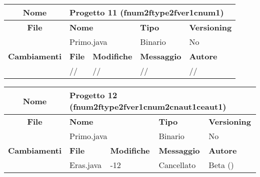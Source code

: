 
\begin{table}[ht]
\footnotesize
\begin{tabular}{|c|p{2.5cm}|p{2cm}|p{2.5cm}|p{2.5cm}|}
  \hline
  \textbf{Nome}	& \multicolumn{4}{l|}{Progetto 11 (fnum2ftype2fver1cnum1)} 										\\
  \hline
  \rowcolor{lightgray}\textbf{File} 		& \multicolumn{2}{l|}{\textbf{Nome}}		& \textbf{Tipo}		& \textbf{Versioning} 		\\
						\cline{2-5}
						& \multicolumn{2}{l|}{Primo.java}		& Binario		& No				\\
  \hline
  \rowcolor{lightgray}\textbf{Cambiamenti}	& \textbf{File}		&\textbf{Modifiche}	& \textbf{Messaggio}	& \textbf{Autore}		\\
						\cline{2-5}
						& //			& //	  		& //			& //				\\
						
  \hline
\end{tabular}
\end{table}

\begin{table}[ht]
\footnotesize
\begin{tabular}{|c|p{2.5cm}|p{2cm}|p{2.5cm}|p{2.5cm}|}
  \hline
  \textbf{Nome}	& \multicolumn{4}{l|}{Progetto 12 (fnum2ftype2fver1cnum2cnaut1ceaut1)} 									\\
  \hline
  \rowcolor{lightgray}\textbf{File} 		& \multicolumn{2}{l|}{\textbf{Nome}}		& \textbf{Tipo}		& \textbf{Versioning} 		\\
						\cline{2-5}
						& \multicolumn{2}{l|}{Primo.java}		& Binario		& No				\\
  \hline
  \rowcolor{lightgray}\textbf{Cambiamenti}	& \textbf{File}		&\textbf{Modifiche}	& \textbf{Messaggio}	& \textbf{Autore}		\\
						\cline{2-5}
						& Eras.java		& -12	 		& Cancellato		& Beta ()			\\
						
  \hline
\end{tabular}
\end{table}

